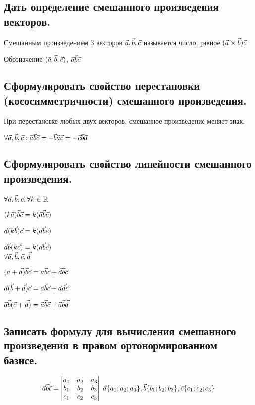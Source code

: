 \subsection{Дать определение смешанного произведения векторов.}

Смешанным произведением 3 векторов $\vec{a}, \vec{b}, \vec{c}$ называется число, равное 
$(\vec{a} \times \vec{b}) \vec{c}$

Обозначение $(\vec{a}, \vec{b}, \vec{c})$, $\vec{a} \vec{b} \vec{c}$

\subsection{Сформулировать свойство перестановки (кососимметричности) смешанного произведения.}

При перестановке любых двух векторов, смешанное произведение меняет знак.

$\forall \vec{a}, \vec{b}, \vec{c}:\vec{a} \vec{b} \vec{c} = - 
\vec{b} \vec{a} \vec{c} = - \vec{c} \vec{b} \vec{a}$

\subsection{Сформулировать свойство линейности смешанного произведения.}

\begin{center}
$\forall \vec{a}, \vec{b}, \vec{c}, \forall k \in \mathbb{R}$

$(k\vec{a})\vec{b}\vec{c} = k(\vec{a}\vec{b}\vec{c})$

$\vec{a}(k\vec{b})\vec{c} = k(\vec{a}\vec{b}\vec{c})$

$\vec{a}\vec{b}(k\vec{c}) = k(\vec{a}\vec{b}\vec{c})$\\

$\forall \vec{a}, \vec{b}, \vec{c}, \vec{d}$

$(\vec{a}+\vec{d})\vec{b}\vec{c} = \vec{a}\vec{b}\vec{c} + \vec{d}\vec{b}\vec{c}$

$\vec{a}(\vec{b}+\vec{d})\vec{c} = \vec{a}\vec{b}\vec{c} + \vec{a}\vec{d}\vec{c}$

$\vec{a}\vec{b}(\vec{c}+\vec{d}) = \vec{a}\vec{b}\vec{c} + \vec{a}\vec{b}\vec{d}$
\end{center}

\subsection{Записать формулу для вычисления смешанного произведения в правом ортонормированном базисе.}

$$\vec{a}\vec{b}\vec{c} = 
\begin{vmatrix}
    a_1 & a_2 & a_3\\
    b_1 & b_2 & b_3\\
    c_1 & c_2 & c_3
\end{vmatrix} \ \vec{a}\{a_1;a_2;a_3\},
\vec{b}\{b_1;b_2;b_3\}, \vec{c}\{c_1;c_2;c_3\}$$

